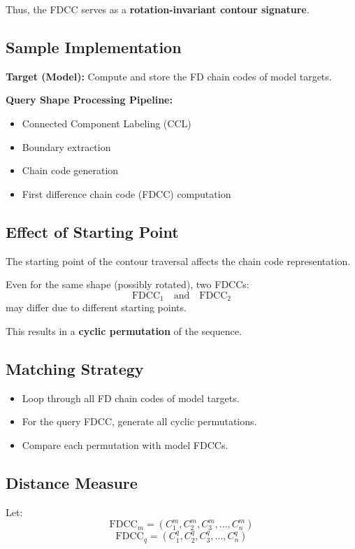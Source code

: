 \documentclass[11pt]{article}
\theoremstyle{definition}
\begin{document}
Thus, the FDCC serves as a \textbf{rotation-invariant contour signature}.

\subsection{Sample Implementation}

\textbf{Target (Model):}  
Compute and store the FD chain codes of model targets.

\textbf{Query Shape Processing Pipeline:}
\begin{itemize}
    \item Connected Component Labeling (CCL)
    \item Boundary extraction
    \item Chain code generation
    \item First difference chain code (FDCC) computation
\end{itemize}

\subsection{Effect of Starting Point}

The starting point of the contour traversal affects the chain code representation.

Even for the same shape (possibly rotated), two FDCCs:
\[
\text{FDCC}_1 \quad \text{and} \quad \text{FDCC}_2
\]
may differ due to different starting points.

This results in a \textbf{cyclic permutation} of the sequence.

\subsection{Matching Strategy}

\begin{itemize}
    \item Loop through all FD chain codes of model targets.
    \item For the query FDCC, generate all cyclic permutations.
    \item Compare each permutation with model FDCCs.
\end{itemize}

\subsection{Distance Measure}

Let:
\[
\text{FDCC}_m = (C_1^m, C_2^m, C_3^m, \ldots, C_n^m)
\]
\[
\text{FDCC}_q = (C_1^q, C_2^q, C_3^q, \ldots, C_n^q)
\]
\end{document}
